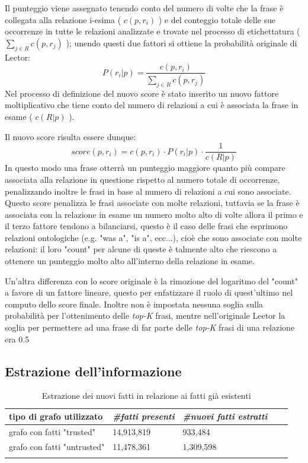 \documentclass[10pt,a4paper,twocolumn]{article}
\begin{document}
Il punteggio viene assegnato tenendo conto del numero di volte che la frase è collegata alla relazione i-esima ( $c(p,r_i)$ ) e del conteggio totale delle sue occorrenze in tutte le relazioni analizzate e trovate nel processo di etichettatura ( $\sum_{j \in R} c(p,r_j)$ ); unendo questi due fattori si ottiene la probabilità originale di Lector:
\[P(r_i|p) = \frac{c(p,r_i)}{\sum_{j \in R}c(p,r_j)}\]
Nel processo di definizione del nuovo score è stato inserito un nuovo fattore moltiplicativo che tiene conto del numero di relazioni a cui è associata la frase in esame ( $c(R|p)$ ).

Il nuovo score risulta essere dunque:
\[score(p,r_i)=c(p,r_i)\cdot P(r_i|p)\cdot \frac{1}{c(R|p)} \]
In questo modo una frase otterrà un punteggio maggiore quanto più compare associata alla relazione in questione rispetto al numero totale di occorrenze, penalizzando inoltre le frasi in base al numero di relazioni a cui sono associate. Questo score penalizza le frasi associate con molte relazioni, tuttavia se la frase è associata con la relazione in esame un numero molto alto di volte allora il primo e il terzo fattore tendono a bilanciarsi, questo è il caso delle frasi che esprimono relazioni ontologiche (e.g. "was a", "is a", ecc...), cioè che sono associate con molte relazioni: il loro "count" per alcune di queste è talmente alto che riescono a ottenere un punteggio molto alto all'interno della relazione in esame.

Un'altra differenza con lo score originale è la rimozione del logaritmo del "count" a favore di un fattore lineare, questo per enfatizzare il ruolo di quest'ultimo nel computo dello score finale. Inoltre non è impostata nessuna soglia sulla probabilità per l'ottenimento delle \textit{top-K} frasi, mentre nell'originale Lector la soglia per permettere ad una frase di far parte delle \textit{top-K} frasi di una relazione era 0.5

\subsection{Estrazione dell'informazione}

\begin{table}[t]
	\centering
	\label{nuovi-vecchi}
	\begin{tabular}{lllll}
		tipo di grafo utilizzato    & \textit{\#fatti presenti} & \textit{\#nuovi fatti estratti} &  &  \\
		\hline
		grafo con fatti "trusted"   & 14,913,819                & 933,484                         &  &  \\
		grafo con fatti "untrusted" & 11,478,361                & 1,309,598                       &  &  \\
		&                           &                                 &  & 
	\end{tabular}
		\caption{Estrazione dei nuovi fatti in relazione ai fatti già esistenti}
\end{table}
\end{document}
